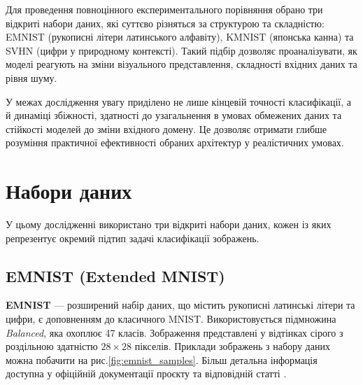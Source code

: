 \documentclass[14pt,a4paper]{extarticle}
\begin{document}
Для проведення повноцінного експериментального порівняння обрано три відкриті набори даних, які суттєво різняться за структурою та складністю: EMNIST (рукописні літери латинського алфавіту), KMNIST (японська канна) та SVHN (цифри у природному контексті). Такий підбір дозволяє проаналізувати, як моделі реагують на зміни візуального представлення, складності вхідних даних та рівня шуму.

У межах дослідження увагу приділено не лише кінцевій точності класифікації, а й динаміці збіжності, здатності до узагальнення в умовах обмежених даних та стійкості моделей до зміни вхідного домену. Це дозволяє отримати глибше розуміння практичної ефективності обраних архітектур у реалістичних умовах.



\section{Набори даних}
\label{sec:datasets}
У цьому дослідженні використано три відкриті набори даних, кожен із яких репрезентує окремий підтип задачі класифікації зображень.

\subsection{EMNIST (Extended MNIST)}
\textbf{EMNIST} --- розширений набір даних, що містить рукописні латинські літери та цифри, є доповненням до класичного MNIST. Використовується підмножина \textit{Balanced}, яка охоплює 47 класів. Зображення представлені у відтінках сірого з роздільною здатністю $28 \times 28$ пікселів. Приклади зображень з набору даних можна побачити на рис.\ref{fig:emnist_samples}. Більш детальна інформація доступна у офіційній документації проєкту \cite{emnist} та відповідній статті \cite{cohen2017emnist}.
\end{document}
